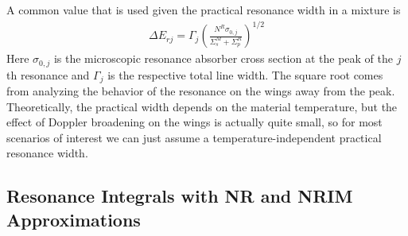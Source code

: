 A common value that is used given the practical resonance width in a mixture is
\begin{align}
  \Delta E_{rj} = \Gamma_j \left( \frac{ N^R \sigma_{0,j} }{ \Sigma_s^M + \Sigma_p^R } \right)^{1/2}
\end{align}
Here $\sigma_{0,j}$ is the microscopic resonance absorber cross section at the peak of the $j$th resonance and $\Gamma_j$ is the respective total line width. The square root comes from analyzing the behavior of the resonance on the wings away from the peak. Theoretically, the practical width depends on the material temperature, but the effect of Doppler broadening on the wings is actually quite small, so for most scenarios of interest we can just assume a temperature-independent practical resonance width.

\subsection{Resonance Integrals with NR and NRIM Approximations}

